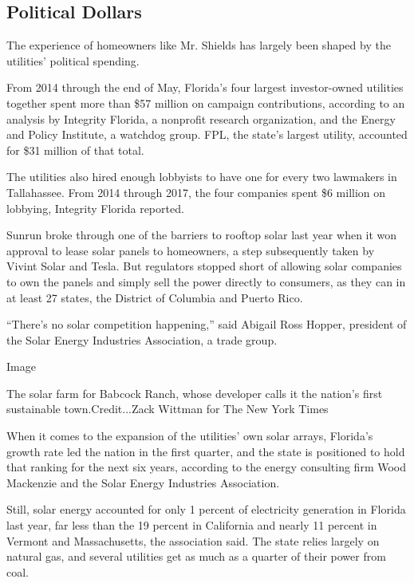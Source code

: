 \hypertarget{political-dollars}{%
\subsection{Political Dollars}\label{political-dollars}}

The experience of homeowners like Mr. Shields has largely been shaped by
the utilities' political spending.

From 2014 through the end of May, Florida's four largest investor-owned
utilities together spent more than \$57 million on campaign
contributions, according to an analysis by Integrity Florida, a
nonprofit research organization, and the Energy and Policy Institute, a
watchdog group. FPL, the state's largest utility, accounted for \$31
million of that total.

The utilities also hired enough lobbyists to have one for every two
lawmakers in Tallahassee. From 2014 through 2017, the four companies
spent \$6 million on lobbying, Integrity Florida reported.

Sunrun broke through one of the barriers to rooftop solar last year when
it won approval to lease solar panels to homeowners, a step subsequently
taken by Vivint Solar and Tesla. But regulators stopped short of
allowing solar companies to own the panels and simply sell the power
directly to consumers, as they can in at least 27 states, the District
of Columbia and Puerto Rico.

``There's no solar competition happening,'' said Abigail Ross Hopper,
president of the Solar Energy Industries Association, a trade group.

Image

The solar farm for Babcock Ranch, whose developer calls it the nation's
first sustainable town.Credit...Zack Wittman for The New York Times

When it comes to the expansion of the utilities' own solar arrays,
Florida's growth rate led the nation in the first quarter, and the state
is positioned to hold that ranking for the next six years, according to
the energy consulting firm Wood Mackenzie and the Solar Energy
Industries Association.

Still, solar energy accounted for only 1 percent of electricity
generation in Florida last year, far less than the 19 percent in
California and nearly 11 percent in Vermont and Massachusetts, the
association said. The state relies largely on natural gas, and several
utilities get as much as a quarter of their power from coal.

